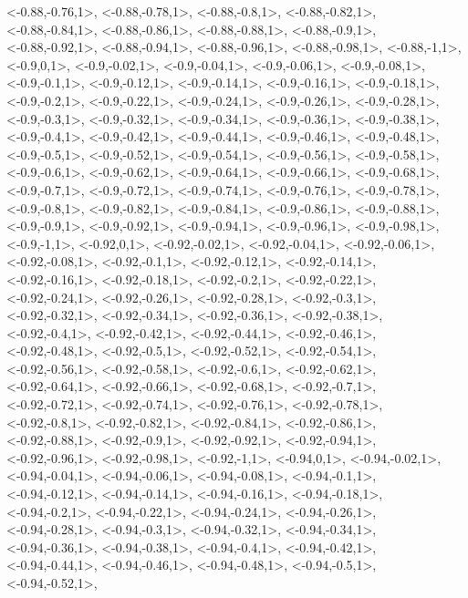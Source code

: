 \documentclass[a4paper,10pt]{article}
\begin{document}
\begin{eulernotebook}
\begin{euleroutput}
  <-0.88,-0.76,1>,
  <-0.88,-0.78,1>,
  <-0.88,-0.8,1>,
  <-0.88,-0.82,1>,
  <-0.88,-0.84,1>,
  <-0.88,-0.86,1>,
  <-0.88,-0.88,1>,
  <-0.88,-0.9,1>,
  <-0.88,-0.92,1>,
  <-0.88,-0.94,1>,
  <-0.88,-0.96,1>,
  <-0.88,-0.98,1>,
  <-0.88,-1,1>,
  <-0.9,0,1>,
  <-0.9,-0.02,1>,
  <-0.9,-0.04,1>,
  <-0.9,-0.06,1>,
  <-0.9,-0.08,1>,
  <-0.9,-0.1,1>,
  <-0.9,-0.12,1>,
  <-0.9,-0.14,1>,
  <-0.9,-0.16,1>,
  <-0.9,-0.18,1>,
  <-0.9,-0.2,1>,
  <-0.9,-0.22,1>,
  <-0.9,-0.24,1>,
  <-0.9,-0.26,1>,
  <-0.9,-0.28,1>,
  <-0.9,-0.3,1>,
  <-0.9,-0.32,1>,
  <-0.9,-0.34,1>,
  <-0.9,-0.36,1>,
  <-0.9,-0.38,1>,
  <-0.9,-0.4,1>,
  <-0.9,-0.42,1>,
  <-0.9,-0.44,1>,
  <-0.9,-0.46,1>,
  <-0.9,-0.48,1>,
  <-0.9,-0.5,1>,
  <-0.9,-0.52,1>,
  <-0.9,-0.54,1>,
  <-0.9,-0.56,1>,
  <-0.9,-0.58,1>,
  <-0.9,-0.6,1>,
  <-0.9,-0.62,1>,
  <-0.9,-0.64,1>,
  <-0.9,-0.66,1>,
  <-0.9,-0.68,1>,
  <-0.9,-0.7,1>,
  <-0.9,-0.72,1>,
  <-0.9,-0.74,1>,
  <-0.9,-0.76,1>,
  <-0.9,-0.78,1>,
  <-0.9,-0.8,1>,
  <-0.9,-0.82,1>,
  <-0.9,-0.84,1>,
  <-0.9,-0.86,1>,
  <-0.9,-0.88,1>,
  <-0.9,-0.9,1>,
  <-0.9,-0.92,1>,
  <-0.9,-0.94,1>,
  <-0.9,-0.96,1>,
  <-0.9,-0.98,1>,
  <-0.9,-1,1>,
  <-0.92,0,1>,
  <-0.92,-0.02,1>,
  <-0.92,-0.04,1>,
  <-0.92,-0.06,1>,
  <-0.92,-0.08,1>,
  <-0.92,-0.1,1>,
  <-0.92,-0.12,1>,
  <-0.92,-0.14,1>,
  <-0.92,-0.16,1>,
  <-0.92,-0.18,1>,
  <-0.92,-0.2,1>,
  <-0.92,-0.22,1>,
  <-0.92,-0.24,1>,
  <-0.92,-0.26,1>,
  <-0.92,-0.28,1>,
  <-0.92,-0.3,1>,
  <-0.92,-0.32,1>,
  <-0.92,-0.34,1>,
  <-0.92,-0.36,1>,
  <-0.92,-0.38,1>,
  <-0.92,-0.4,1>,
  <-0.92,-0.42,1>,
  <-0.92,-0.44,1>,
  <-0.92,-0.46,1>,
  <-0.92,-0.48,1>,
  <-0.92,-0.5,1>,
  <-0.92,-0.52,1>,
  <-0.92,-0.54,1>,
  <-0.92,-0.56,1>,
  <-0.92,-0.58,1>,
  <-0.92,-0.6,1>,
  <-0.92,-0.62,1>,
  <-0.92,-0.64,1>,
  <-0.92,-0.66,1>,
  <-0.92,-0.68,1>,
  <-0.92,-0.7,1>,
  <-0.92,-0.72,1>,
  <-0.92,-0.74,1>,
  <-0.92,-0.76,1>,
  <-0.92,-0.78,1>,
  <-0.92,-0.8,1>,
  <-0.92,-0.82,1>,
  <-0.92,-0.84,1>,
  <-0.92,-0.86,1>,
  <-0.92,-0.88,1>,
  <-0.92,-0.9,1>,
  <-0.92,-0.92,1>,
  <-0.92,-0.94,1>,
  <-0.92,-0.96,1>,
  <-0.92,-0.98,1>,
  <-0.92,-1,1>,
  <-0.94,0,1>,
  <-0.94,-0.02,1>,
  <-0.94,-0.04,1>,
  <-0.94,-0.06,1>,
  <-0.94,-0.08,1>,
  <-0.94,-0.1,1>,
  <-0.94,-0.12,1>,
  <-0.94,-0.14,1>,
  <-0.94,-0.16,1>,
  <-0.94,-0.18,1>,
  <-0.94,-0.2,1>,
  <-0.94,-0.22,1>,
  <-0.94,-0.24,1>,
  <-0.94,-0.26,1>,
  <-0.94,-0.28,1>,
  <-0.94,-0.3,1>,
  <-0.94,-0.32,1>,
  <-0.94,-0.34,1>,
  <-0.94,-0.36,1>,
  <-0.94,-0.38,1>,
  <-0.94,-0.4,1>,
  <-0.94,-0.42,1>,
  <-0.94,-0.44,1>,
  <-0.94,-0.46,1>,
  <-0.94,-0.48,1>,
  <-0.94,-0.5,1>,
  <-0.94,-0.52,1>,

\end{euleroutput}
\end{eulernotebook}
\end{document}
